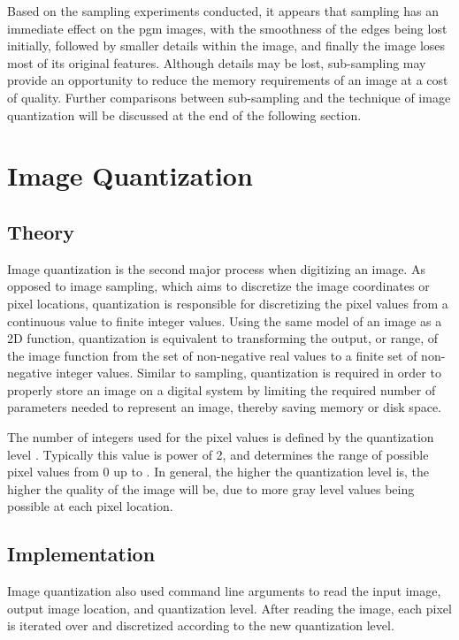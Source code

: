 \documentclass[headings=optiontoheadandtoc,listof=totoc,parskip=full]{scrartcl}
\begin{document}
Based on the sampling experiments conducted, it appears that sampling has an immediate effect on the pgm images, with the smoothness of the edges being lost initially, followed by smaller details within the image, and finally the image loses most of its original features. Although details may be lost, sub-sampling may provide an opportunity to reduce the memory requirements of an image at a cost of quality. Further comparisons between sub-sampling and the technique of image quantization will be discussed at the end of the following section.

\section{Image Quantization}

\subsection{Theory}
Image quantization is the second major process when digitizing an image. As opposed to image sampling, which aims to discretize the image coordinates or pixel locations, quantization is responsible for discretizing the pixel values from a continuous value to finite integer values. Using the same model of an image as a 2D function, quantization is equivalent to transforming the output, or range, of the image function  from the set of non-negative real values to a finite set of non-negative integer values. Similar to sampling, quantization is required in order to properly store an image on a digital system by limiting the required number of parameters needed to represent an image, thereby saving memory or disk space.

The number of integers used for the pixel values is defined by the quantization level . Typically this value is power of 2, and determines the range of possible pixel values from 0 up to . In general, the higher the quantization level is, the higher the quality of the image will be, due to more gray level values being possible at each pixel location. 

\subsection{Implementation}

Image quantization also used command line arguments to read the input image, output image location, and quantization level. After reading the image, each pixel is iterated over and discretized according to the new quantization level. 
\end{document}
